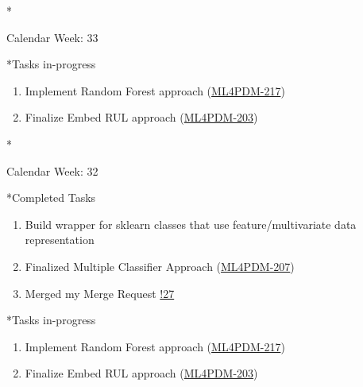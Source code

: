 \documentclass[11pt,a4paper]{article}
\begin{document}
\newpage
\begin{section}*{Calendar Week: 33 \hfill \date{20 August, 2021}}
 \begin{refsection}
   \begin{subsection}*{Tasks in-progress}
     \begin{enumerate}
       \item
             Implement Random Forest approach  (\href{https://ml4pdm.atlassian.net/browse/ML4PDM-217}{ML4PDM-217})
       \item
             Finalize Embed RUL approach  (\href{https://ml4pdm.atlassian.net/browse/ML4PDM-203}{ML4PDM-203})
     \end{enumerate}
   \end{subsection}
 \end{refsection}
\end{section}

\newpage
\begin{section}*{Calendar Week: 32 \hfill \date{13 August, 2021}}
 \begin{refsection}
   \begin{subsection}*{Completed Tasks}
     \begin{enumerate}
       \item
             Build wrapper for sklearn classes that use feature/multivariate data representation
       \item
             Finalized Multiple Classifier Approach (\href{https://ml4pdm.atlassian.net/browse/ML4PDM-207}{ML4PDM-207})
       \item
             Merged my Merge Request \href{https://git.cs.uni-paderborn.de/machine-learning-for-predictive-maintenance/code/-/merge_requests/27}{!27}
     \end{enumerate}
   \end{subsection}
   \begin{subsection}*{Tasks in-progress}
     \begin{enumerate}
       \item
             Implement Random Forest approach  (\href{https://ml4pdm.atlassian.net/browse/ML4PDM-217}{ML4PDM-217})
       \item
             Finalize Embed RUL approach  (\href{https://ml4pdm.atlassian.net/browse/ML4PDM-203}{ML4PDM-203})
     \end{enumerate}
   \end{subsection}
 \end{refsection}
\end{section}
\end{document}
